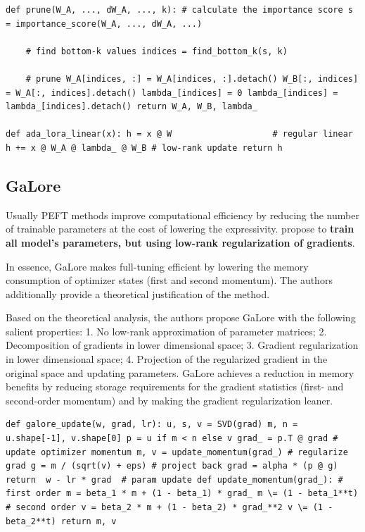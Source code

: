\begin{lstlisting}
def prune(W_A, ..., dW_A, ..., k): # calculate the importance score s = importance_score(W_A, ..., dW_A, ...)

    # find bottom-k values indices = find_bottom_k(s, k)

    # prune W_A[indices, :] = W_A[indices, :].detach() W_B[:, indices] = W_A[:, indices].detach() lambda_[indices] = 0 lambda_[indices] = lambda_[indices].detach() return W_A, W_B, lambda_

def ada_lora_linear(x): h = x @ W                    # regular linear h += x @ W_A @ lambda_ @ W_B # low-rank update return h

\end{lstlisting}

\subsection{GaLore}

Usually PEFT methods improve computational efficiency by reducing the number of trainable parameters at the cost of lowering the expressivity. \citet{zhao2024galore} propose to \textbf{train all model's parameters, but using low-rank regularization of gradients}. 

In essence, GaLore makes full-tuning efficient by lowering the memory consumption of optimizer states (first and second momentum). The authors additionally provide a theoretical justification of the method.

Based on the theoretical analysis, the authors propose GaLore with the following salient properties: 1. No low-rank approximation of parameter matrices; 2. Decomposition of gradients in lower dimensional space; 3. Gradient regularization in lower dimensional space; 4. Projection of the regularized gradient in the original space and updating parameters. GaLore achieves a reduction in memory benefits by reducing storage requirements for the gradient statistics (first- and second-order momentum) and by making the gradient regularization leaner.

\begin{lstlisting}
def galore_update(w, grad, lr): u, s, v = SVD(grad) m, n = u.shape[-1], v.shape[0] p = u if m < n else v grad_ = p.T @ grad # update optimizer momentum m, v = update_momentum(grad_) # regularize grad g = m / (sqrt(v) + eps) # project back grad = alpha * (p @ g) return  w - lr * grad  # param update def update_momentum(grad_): # first order m = beta_1 * m + (1 - beta_1) * grad_ m \= (1 - beta_1**t) # second order v = beta_2 * m + (1 - beta_2) * grad_**2 v \= (1 - beta_2**t) return m, v
\end{lstlisting}

